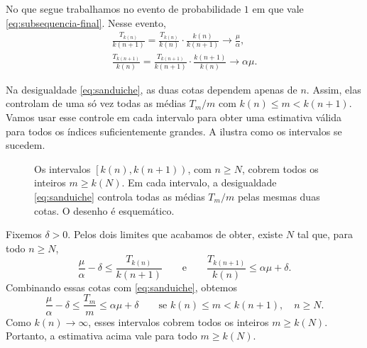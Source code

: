 \documentclass[12pt,portuguese]{article}
\theoremstyle{definition}
\theoremstyle{plainexercise}
\theoremstyle{starredexercise}
\theoremstyle{definition}
\begin{document}
No que segue trabalhamos no evento de probabilidade $1$ em que vale
\eqref{eq:subsequencia-final}. Nesse evento,
\begin{gather*}
\frac{T_{k(n)}}{k(n+1)}
=
\frac{T_{k(n)}}{k(n)}\cdot\frac{k(n)}{k(n+1)}
\longrightarrow
\frac{\mu}{\alpha},
\\[0.4cm]
\frac{T_{k(n+1)}}{k(n)}
=
\frac{T_{k(n+1)}}{k(n+1)}\cdot\frac{k(n+1)}{k(n)}
\longrightarrow
\alpha\mu.
\end{gather*}

Na desigualdade \eqref{eq:sanduiche}, as duas cotas dependem apenas de $n$.
Assim, elas controlam de uma só vez todas as médias $T_m/m$ com
$k(n)\leqslant m<k(n+1)$. Vamos usar esse controle em cada intervalo para
obter uma estimativa válida para todos os índices suficientemente grandes.
A  ilustra como os intervalos se sucedem.

\begin{figure}[H]
\centering
{}
\caption{Os intervalos $\left[k(n),k(n+1)\right)$, com $n\geqslant N$,
cobrem todos os inteiros $m\geqslant k(N)$. Em cada intervalo, a desigualdade
\eqref{eq:sanduiche} controla todas as médias $T_m/m$ pelas mesmas duas
cotas. O desenho é esquemático.}
\label{fig:blocos-geometricos}
\end{figure}

Fixemos $\delta>0$. Pelos dois limites que acabamos de obter, existe $N$
tal que, para todo $n\geqslant N$,
\[
\frac{\mu}{\alpha}-\delta
\leqslant\frac{T_{k(n)}}{k(n+1)}
\qquad\text{e}\qquad
\frac{T_{k(n+1)}}{k(n)}\leqslant\alpha\mu+\delta.
\]
Combinando essas cotas com \eqref{eq:sanduiche}, obtemos
\[
\frac{\mu}{\alpha}-\delta
\leqslant\frac{T_m}{m}\leqslant\alpha\mu+\delta
\qquad\text{se }k(n)\leqslant m<k(n+1),\quad n\geqslant N.
\]
Como $k(n)\to\infty$, esses intervalos cobrem todos os inteiros
$m\geqslant k(N)$. Portanto, a estimativa acima vale para todo
$m\geqslant k(N)$.
\end{document}
